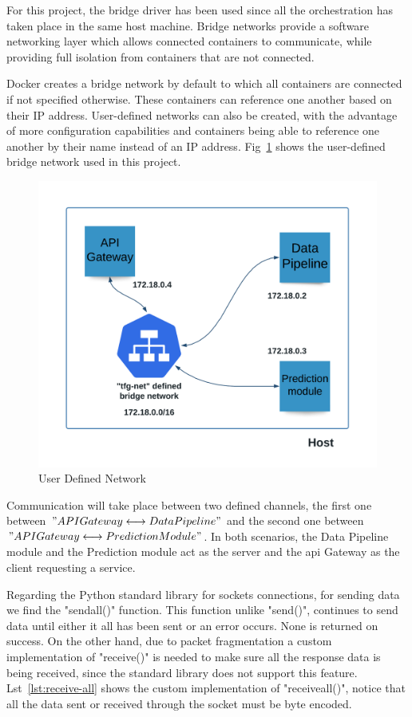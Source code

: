 For this project, the bridge driver has been used since all the orchestration has taken place in the same host machine. Bridge networks provide a software networking layer which allows connected containers to communicate, while providing full isolation from containers that are not connected.

Docker creates a bridge network by default to which all containers are connected if not specified otherwise. These containers can reference one another based on their IP address. User-defined networks can also be created, with the advantage of more configuration capabilities and containers being able to reference one another by their name instead of an IP address. Fig~\ref{fig:tfg-net} shows the user-defined bridge network used in this project.

\begin{figure}[h]
    \centering
    \includegraphics[width=\textwidth]{figures/tfg-net.png}
     \caption{User Defined Network}
    \label{fig:tfg-net}
\end{figure}

Communication will take place between two defined channels, the first one between $"API Gateway \longleftrightarrow Data Pipeline"$ and the second one between $"API Gateway \longleftrightarrow Prediction Module"$. In both scenarios, the Data Pipeline module and the Prediction module act as the server and the \gls{api} Gateway as the client requesting a service. 

Regarding the Python standard library for sockets connections, for sending data we find the "sendall()" function. This function unlike "send()", continues to send data until either it all has been sent or an error occurs. None is returned on success. On the other hand, due to packet fragmentation a custom implementation of "receive()" is needed to make sure all the response data is being received, since the standard library does not support this feature. Lst~\ref{lst:receive-all} shows the custom implementation of "receiveall()", notice that all the data sent or received through the socket must be byte encoded.\\

